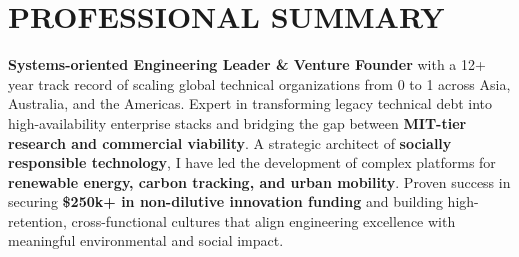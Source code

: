 \section{PROFESSIONAL SUMMARY}
\textbf{Systems-oriented Engineering Leader \& Venture Founder} with
a 12+ year track record of scaling global technical organizations
from 0 to 1 across Asia, Australia, and the Americas. Expert in
transforming legacy technical debt into high-availability enterprise
stacks and bridging the gap between \textbf{MIT-tier research and
commercial viability}. A strategic architect of \textbf{socially
responsible technology}, I have led the development of complex
platforms for \textbf{renewable energy, carbon tracking, and urban
mobility}. Proven success in securing \textbf{\$250k+ in non-dilutive
innovation funding} and building high-retention, cross-functional
cultures that align engineering excellence with meaningful
environmental and social impact.
